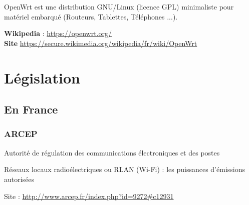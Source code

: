 \documentclass[a4paper,french,11pt,twoside]{article}
\begin{document}
OpenWrt est une distribution GNU/Linux (licence GPL) minimaliste pour matériel embarqué (Routeurs, Tablettes, Téléphones ...).

\medskip
\noindent \textbf{Wikipedia} : \url{https://openwrt.org/}\\
\noindent \textbf{Site} \url{https://secure.wikimedia.org/wikipedia/fr/wiki/OpenWrt}

\section{Législation}\label{legislation}

\subsection{En France}
\subsubsection{ARCEP}
\noindent Autorité de régulation des communications électroniques et des postes

\medskip
\noindent Réseaux locaux radioélectriques ou RLAN (Wi-Fi) : les puissances d'émissions autorisées

\medskip
\noindent Site : \url{http://www.arcep.fr/index.php?id=9272#c12931}
\end{document}
